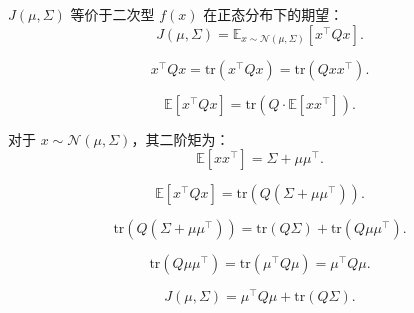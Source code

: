  \( J(\mu, \Sigma) \) 等价于二次型 \( f(x) \) 在正态分布下的期望：
\[
J(\mu, \Sigma) = \mathbb{E}_{x \sim \mathcal{N}(\mu, \Sigma)} \left[ x^\top Q x \right].
\]
 
\[
x^\top Q x = \text{tr}(x^\top Q x) = \text{tr}(Q x x^\top).
\]

\[
\mathbb{E}[x^\top Q x] = \text{tr}\left( Q \cdot \mathbb{E}[x x^\top] \right).
\]
  
对于 \( x \sim \mathcal{N}(\mu, \Sigma) \)，其二阶矩为：
\[
\mathbb{E}[x x^\top] = \Sigma + \mu \mu^\top.
\]

\[
\mathbb{E}[x^\top Q x] = \text{tr}\left( Q (\Sigma + \mu \mu^\top) \right).
\]



\[
\text{tr}\left( Q (\Sigma + \mu \mu^\top) \right) = \text{tr}(Q \Sigma) + \text{tr}(Q \mu \mu^\top).
\]

\[
\text{tr}(Q \mu \mu^\top) = \text{tr}(\mu^\top Q \mu) = \mu^\top Q \mu.
\]

 
\[
\boxed{J(\mu, \Sigma) = \mu^\top Q \mu + \text{tr}(Q \Sigma)}.
\]

